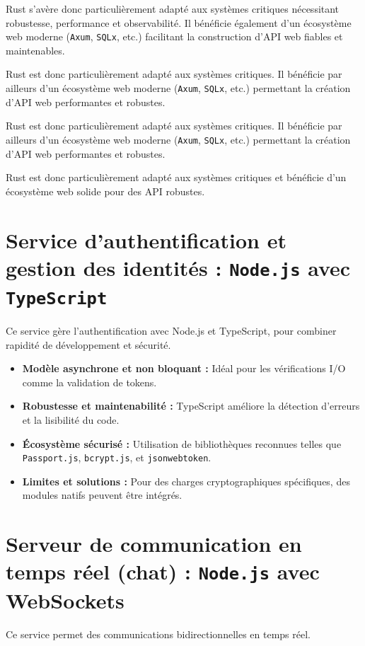 \documentclass{rapportPfe}
\begin{document}
Rust s’avère donc particulièrement adapté aux systèmes critiques nécessitant robustesse, performance et observabilité. Il bénéficie également d’un écosystème web moderne (\texttt{Axum}, \texttt{SQLx}, etc.) facilitant la construction d’API web fiables et maintenables.

Rust est donc particulièrement adapté aux systèmes critiques. Il bénéficie par ailleurs d’un écosystème web moderne (\texttt{Axum}, \texttt{SQLx}, etc.) permettant la création d’API web performantes et robustes.

Rust est donc particulièrement adapté aux systèmes critiques. Il bénéficie par ailleurs d’un écosystème web moderne (\texttt{Axum}, \texttt{SQLx}, etc.) permettant la création d’API web performantes et robustes.

Rust est donc particulièrement adapté aux systèmes critiques et bénéficie d’un écosystème web solide pour des API robustes.

\section{Service d’authentification et gestion des identités : \texttt{Node.js} avec \texttt{TypeScript}}

Ce service gère l’authentification avec Node.js et TypeScript, pour combiner rapidité de développement et sécurité.

\begin{itemize}
    \item \textbf{Modèle asynchrone et non bloquant :} Idéal pour les vérifications I/O comme la validation de tokens.
    \item \textbf{Robustesse et maintenabilité :} TypeScript améliore la détection d’erreurs et la lisibilité du code.
    \item \textbf{Écosystème sécurisé :} Utilisation de bibliothèques reconnues telles que \texttt{Passport.js}, \texttt{bcrypt.js}, et \texttt{jsonwebtoken}.
    \item \textbf{Limites et solutions :} Pour des charges cryptographiques spécifiques, des modules natifs peuvent être intégrés.
\end{itemize}

\section{Serveur de communication en temps réel (chat) : \texttt{Node.js} avec WebSockets}

Ce service permet des communications bidirectionnelles en temps réel.
\end{document}
